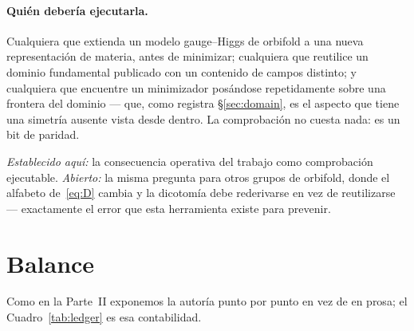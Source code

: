 \documentclass[11pt,a4paper]{article}
\begin{document}
\paragraph{Quién debería ejecutarla.} Cualquiera que extienda un modelo gauge--Higgs de
orbifold a una nueva representación de materia, antes de minimizar; cualquiera que reutilice
un dominio fundamental publicado con un contenido de campos distinto; y cualquiera que
encuentre un minimizador posándose repetidamente sobre una frontera del dominio --- que, como
registra \S\ref{sec:domain}, es el aspecto que tiene una simetría ausente vista desde dentro.
La comprobación no cuesta nada: es un bit de paridad.

\emph{Establecido aquí:} la consecuencia operativa del trabajo como comprobación ejecutable.
\emph{Abierto:} la misma pregunta para otros grupos de orbifold, donde el alfabeto
de~\eqref{eq:D} cambia y la dicotomía debe rederivarse en vez de reutilizarse --- exactamente
el error que esta herramienta existe para prevenir.

\section{Balance}\label{sec:ledger}
Como en la Parte~II exponemos la autoría punto por punto en vez de en prosa; el
Cuadro~\ref{tab:ledger} es esa contabilidad.
\end{document}
